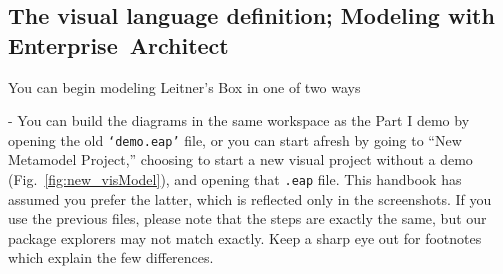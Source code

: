 \visHeader
\subsection[The visual language definition: Modeling with Diagrams]{The visual language definition; Modeling with \mbox{Enterprise Architect}}
\label{sec:staticAbstract}

\vspace{0.5cm}

\hypertarget{static vis}{You can begin modeling Leitner's Box in one of two ways} - You can build the diagrams in the same workspace as the Part I demo by
opening the old \texttt{`demo.eap'} file, or you can start afresh by going to ``New Metamodel Project,'' choosing to start a new visual project without a demo
(Fig.~\ref{fig:new_visModel}), and opening that \texttt{.eap} file. This handbook has assumed you prefer the latter, which is reflected only in the screenshots.
If you use the previous files, please note that the steps are exactly the same, but our package explorers may not match exactly. Keep a sharp eye out for
footnotes which explain the few differences.

